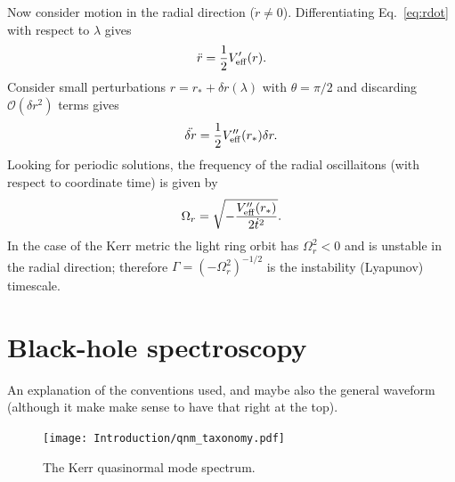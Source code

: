 Now consider motion in the radial direction ($\dot{r}\neq 0$).
Differentiating Eq.~\ref{eq:rdot} with respect to $\lambda$ gives
\begin{align}
	\ddot{r} = \frac{1}{2}V'_{\rm eff}(r).
\end{align}
Consider small perturbations $r = r_*+\delta r(\lambda)$ with $\theta = \pi/2$ and discarding $\mathcal{O}(\delta r^2)$ terms gives
\begin{align}
	\ddot{\delta r} = \frac{1}{2}V''_{\rm eff}(r_*)\delta r.
\end{align}
Looking for periodic solutions, the frequency of the radial oscillaitons (with respect to coordinate time) is given by
\begin{align}
	\Omega_{r} = \sqrt{-\frac{V''_{\rm eff}(r_*)}{2\dot{t}^2}}.
\end{align}
In the case of the Kerr metric the light ring orbit has $\Omega_r^2<0$ and is unstable in the radial direction; therefore $\Gamma = (-\Omega_r^2)^{-1/2}$ is the instability (Lyapunov) timescale.

\section{Black-hole spectroscopy}

An explanation of the conventions used, and maybe also the general waveform (although it make make sense to have that right at the top). 

\begin{figure}[t]
	\centering
	\texttt{[image: Introduction/qnm\_taxonomy.pdf]}
	\caption[The Kerr quasinormal mode spectrum]{ 
		The Kerr quasinormal mode spectrum.}
	\label{fig:ch1:qnm_taxonomy}
\end{figure}